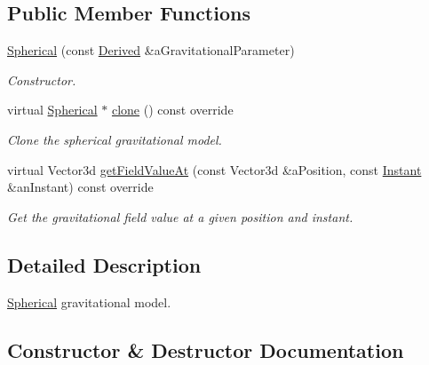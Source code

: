 \subsection*{Public Member Functions}
\begin{DoxyCompactItemize}
\item 
\hyperlink{classlibrary_1_1physics_1_1environment_1_1gravitational_1_1_spherical_a988c31125ac7141be32c0d274ccc73cb}{Spherical} (const \hyperlink{classlibrary_1_1physics_1_1units_1_1_derived}{Derived} \&a\+Gravitational\+Parameter)
\begin{DoxyCompactList}\small\item\em Constructor. \end{DoxyCompactList}\item 
virtual \hyperlink{classlibrary_1_1physics_1_1environment_1_1gravitational_1_1_spherical}{Spherical} $\ast$ \hyperlink{classlibrary_1_1physics_1_1environment_1_1gravitational_1_1_spherical_a4f27273f7e9897e9d67607a8b7b0bca7}{clone} () const override
\begin{DoxyCompactList}\small\item\em Clone the spherical gravitational model. \end{DoxyCompactList}\item 
virtual Vector3d \hyperlink{classlibrary_1_1physics_1_1environment_1_1gravitational_1_1_spherical_ae33a94d691c7fa1aea5bfc629fd3fb9f}{get\+Field\+Value\+At} (const Vector3d \&a\+Position, const \hyperlink{classlibrary_1_1physics_1_1time_1_1_instant}{Instant} \&an\+Instant) const override
\begin{DoxyCompactList}\small\item\em Get the gravitational field value at a given position and instant. \end{DoxyCompactList}\end{DoxyCompactItemize}


\subsection{Detailed Description}
\hyperlink{classlibrary_1_1physics_1_1environment_1_1gravitational_1_1_spherical}{Spherical} gravitational model. 

\subsection{Constructor \& Destructor Documentation}
\mbox{\label{classlibrary_1_1physics_1_1environment_1_1gravitational_1_1_spherical_a988c31125ac7141be32c0d274ccc73cb}} 
